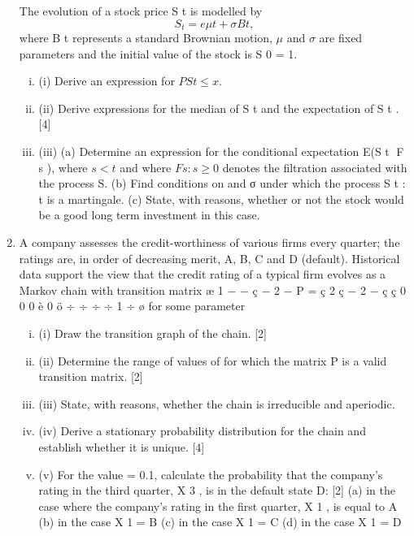 \documentclass[a4paper,12pt]{article}
\begin{document}
\begin{enumerate}



The evolution of a stock price S t is modelled by
\[S_t = e \mu t +σ B t ,\]
where B t represents a standard Brownian motion, $\mu$ and $\sigma$ are fixed parameters
and the initial value of the stock is S 0 = 1.
\begin{enumerate}[(i)]
\item (i) Derive an expression for $P{S t \leq x}$.%
\item (ii) Derive expressions for the median of S t and the expectation of S t . [4]
\item (iii) (a) Determine an expression for the conditional expectation E(S t F s ),
where $s < t$ and where ${F s : s \geq 0}$ denotes the filtration associated
with the process S.
(b) Find conditions on \mu and σ under which the process {S t : t } is a
martingale.
(c) State, with reasons, whether or not the stock would be a good long
term investment in this case.
\end{enumerate}
\item A company assesses the credit-worthiness of various firms every quarter; the ratings are, in order of decreasing merit, A, B, C and D (default). Historical data support the view that the credit rating of a typical firm evolves as a Markov
chain with transition matrix
æ 1 − \alpha − 
\alpha
{}
ç
 − 2 \alpha − 
\alpha
P = ç
2
ç
\alpha
{} − 2 \alpha − 
ç ç
0
0
0
è
0 ö
÷
 ÷
\alpha ÷
÷
1 ÷ ø
for some parameter \alpha

\begin{enumerate}[(i)]
\item (i) Draw the transition graph of the chain. [2]
\item (ii) Determine the range of values of \alpha for which the matrix P is a valid
transition matrix. [2]
\item (iii) State, with reasons, whether the chain is irreducible and aperiodic.
\item (iv) Derive a stationary probability distribution for the chain and establish
whether it is unique.
[4]
\item (v) For the value \alpha = 0.1, calculate the probability that the company’s rating
in the third quarter, X 3 , is in the default state D:
[2]
(a) in the case where the company’s rating in the first quarter, X 1 , is
equal to A
(b) in the case X 1 = B
(c) in the case X 1 = C
(d) in the case X 1 = D
\end{enumerate}
\newpage


\end{enumerate}
\end{document}
